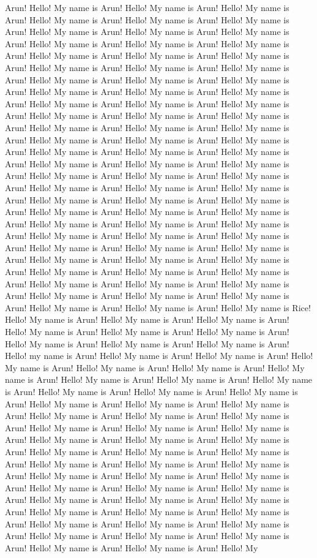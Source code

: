 \documentclass[10pt,a4paper,oneside]{article}
\begin{document}
Arun!	Hello! My name is Arun!	Hello! My name is Arun!	Hello! My name is Arun!	Hello! My name is Arun!	Hello! My name is Arun!	Hello! My name is Arun!	Hello! My name is Arun!	Hello! My name is Arun!	Hello! My name is Arun!	Hello! My name is Arun!	Hello! My name is Arun!	Hello! My name is Arun!	Hello! My name is Arun! 	Hello! My name is Arun!	Hello! My name is Arun!	Hello! My name is Arun!	Hello! My name is Arun!	Hello! My name is Arun!	Hello! My name is Arun!	Hello! My name is Arun!	Hello! My name is Arun!	Hello! My name is Arun!	Hello! My name is Arun!	Hello! My name is Arun!	Hello! My name is Arun!	Hello! My name is Arun!	Hello! My name is Arun!	Hello! My name is Arun!	Hello! My name is Arun!	Hello! My name is Arun!	Hello! My name is Arun!	Hello! My name is Arun!	Hello! My name is Arun! 	Hello! My name is Arun!	Hello! My name is Arun!	Hello! My name is Arun!	Hello! My name is Arun!	Hello! My name is Arun!	Hello! My name is Arun!	Hello! My name is Arun!	Hello! My name is Arun!	Hello! My name is Arun!	Hello! My name is Arun!	Hello! My name is Arun!	Hello! My name is Arun!	Hello! My name is Arun!	Hello! My name is Arun!	Hello! My name is Arun!	Hello! My name is Arun!	Hello! My name is Arun!	Hello! My name is Arun!	Hello! My name is Arun!	Hello! My name is Arun! 	Hello! My name is Arun!	Hello! My name is Arun!	Hello! My name is Arun!	Hello! My name is Arun!	Hello! My name is Arun!	Hello! My name is Arun!	Hello! My name is Arun!	Hello! My name is Arun!	Hello! My name is Arun!	Hello! My name is Arun!	Hello! My name is Arun!	Hello! My name is Arun!	Hello! My name is Arun!	Hello! My name is Arun!	Hello! My name is Arun!	Hello! My name is Arun!	Hello! My name is Arun!	Hello! My name is Arun!	Hello! My name is Arun!	Hello! My name is Arun! 	Hello! My name is Arun!	Hello! My name is Arun!	Hello! My name is Arun!	Hello! My name is Arun!	Hello! My name is Rice!	Hello! My name is Arun!	Hello! My name is Arun!	Hello! My name is Arun!	Hello! My name is Arun!	Hello! My name is Arun!	Hello! My name is Arun!	Hello! My name is Arun!	Hello! My name is Arun!	Hello! My name is Arun!	Hello! my name is Arun! Hello! My name is Arun!	Hello! My name is Arun!	Hello! My name is Arun!	Hello! My name is Arun!	Hello! My name is Arun! 	Hello! My name is Arun!	Hello! My name is Arun!	Hello! My name is Arun!	Hello! My name is Arun!	Hello! My name is Arun!	Hello! My name is Arun!	Hello! My name is Arun!	Hello! My name is Arun!	Hello! My name is Arun!	Hello! My name is Arun!	Hello! My name is Arun!	Hello! My name is Arun!	Hello! My name is Arun!	Hello! My name is Arun!	Hello! My name is Arun!	Hello! My name is Arun!	Hello! My name is Arun!	Hello! My name is Arun!	Hello! My name is Arun! Hello! My name is Arun! 	Hello! My name is Arun!	Hello! My name is Arun!	Hello! My name is Arun!	Hello! My name is Arun!	Hello! My name is Arun!	Hello! My name is Arun!	Hello! My name is Arun!	Hello! My name is Arun!	Hello! My name is Arun!	Hello! My name is Arun!	Hello! My name is Arun!	Hello! My name is Arun!	Hello! My name is Arun!	Hello! My name is Arun!	Hello! My name is Arun!	Hello! My name is Arun!	Hello! My name is Arun!	Hello! My name is Arun!	Hello! My name is Arun!	Hello! My name is Arun! 	Hello! My name is Arun!	Hello! My name is Arun!	Hello! My name is Arun!	Hello! My name is Arun!	Hello! My name is Arun!	Hello! My 
\end{document}
